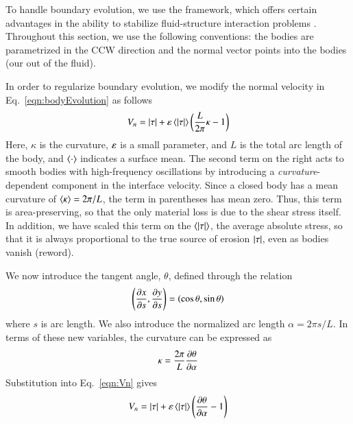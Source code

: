\documentclass[preprint, 10pt]{elsarticle}
\begin{document}
To handle boundary evolution, we use the {\thL} framework, which offers
certain advantages in the ability to stabilize fluid-structure
interaction problems \cite{hou-low-she1994}. Throughout this section, we
use the following conventions: the bodies are parametrized in the CCW
direction and the normal vector points into the bodies (our out of the
fluid).

In order to regularize boundary evolution, we modify the normal velocity
in Eq.~\eqref{eqn:bodyEvolution} as follows
\begin{equation}
\label{eqn:Vn}
V_n = \lvert \tau \rvert + \varepsilon \left< \lvert \tau \rvert \right> \left( \frac{L }{2\pi} \kappa - 1 \right)
\end{equation}
Here, $\kappa$ is the curvature, $\varepsilon$ is a small parameter, and $L$ is the total arc length of the body, and $\left< \cdot \right>$ indicates a surface mean. The second term on the right acts to smooth bodies with high-frequency oscillations by introducing a {\em curvature}-dependent component in the interface velocity. Since a closed body has a mean curvature of $\left< \kappa \right> = 2\pi / L$, the term in parentheses has mean zero. Thus, this term is area-preserving, so that the only material loss is due to the shear stress itself. In addition, we have scaled this term on the $\left< \lvert \tau \rvert \right>$, the average absolute stress, so that it is always proportional to the true source of erosion $\lvert \tau \rvert$, even as bodies vanish (reword).

We now introduce the tangent angle, $\theta$, defined through the relation
\begin{equation}
\left( \frac{\partial x}{\partial s}, \frac{\partial y}{\partial s} \right) = \left(\cos \theta, \sin \theta \right)
\end{equation}
where $s$ is arc length. We also introduce the normalized arc length $\alpha = 2 \pi s / L$. In terms of these new variables, the curvature can be expressed as
\begin{equation}
\kappa = \frac{2 \pi}{L} \frac{\partial \theta}{\partial \alpha}
\end{equation}
Substitution into Eq.~\eqref{eqn:Vn} gives
\begin{equation}
\label{eqn:Vn2}
V_n = \lvert \tau \rvert +  \varepsilon \left< \lvert \tau \rvert \right>   \left(\frac{\partial \theta}{\partial \alpha} - 1 \right)
\end{equation}
\end{document}
